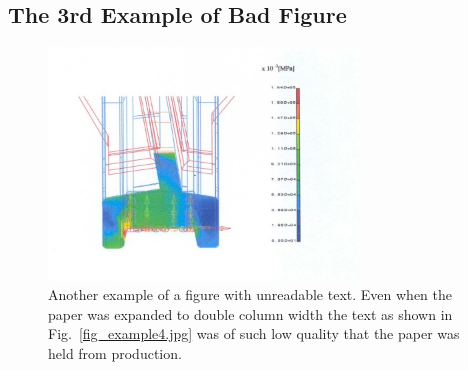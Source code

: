 \documentclass[twocolumn,10pt,cleanfoot]{asme2ej}
\begin{document}
\subsection{The 3rd Example of Bad Figure}
\begin{figure} 
\centerline{\includegraphics[width=3.25in]{figure/FMANU_MD_04_1274_13.jpg}}
\caption{Another example of a figure with unreadable text.  Even when the paper was expanded to double column width the text as shown in Fig.~\ref{fig_example4.jpg} was of such low quality that the paper was held from production.}
\label{fig_example3.jpg}
\end{figure}
\end{document}
